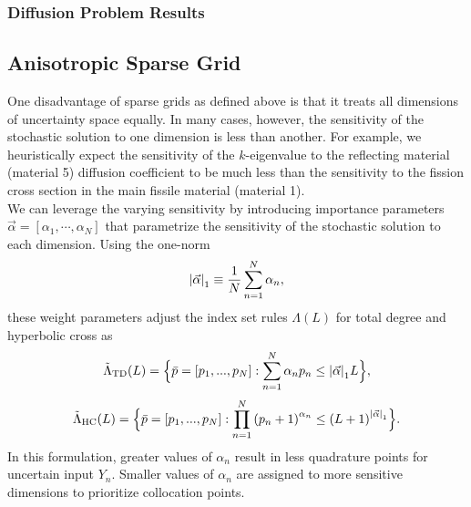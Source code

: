 \documentclass[11pt]{article}
\begin{document}
\subsubsection{Diffusion Problem Results}



\subsection{Anisotropic Sparse Grid}
One disadvantage of sparse grids as defined above is that it treats all dimensions of uncertainty space equally.  In many cases, however, the sensitivity of the stochastic solution to one dimension is less than another.  For example, we heuristically expect the sensitivity of the $k$-eigenvalue to the reflecting material (material 5) diffusion coefficient to be much less than the sensitivity to the fission cross section in the main fissile material (material 1).  \\

We can leverage the varying sensitivity by introducing importance parameters $\vec\alpha=[\alpha_1,\cdots,\alpha_N]$ that parametrize the sensitivity of the stochastic solution to each dimension.  Using the one-norm
\begin{equation}
\qty|\vec\alpha|_1\equiv\frac{1}{N}\sum_{n=1}^N \alpha_n,
\end{equation}
these weight parameters adjust the index set rules $\Lambda(L)$ for total degree and hyperbolic cross as
\begin{equation}
\tilde\Lambda_\text{TD}(L)=\Big\{\bar p=[p_1,...,p_N]:\sum_{n=1}^N \alpha_n p_n \leq \qty|\vec\alpha|_1 L \Big\},
\end{equation}
\begin{equation}
\tilde\Lambda_\text{HC}(L)=\Big\{\bar p=[p_1,...,p_N]:\prod_{n=1}^N \qty(p_n+1)^{\alpha_n} \leq \qty(L+1)^{\qty|\vec\alpha|_1} \Big\}.
\end{equation}
In this formulation, greater values of $\alpha_n$ result in less quadrature points for uncertain input $Y_n$.  Smaller values of $\alpha_n$ are assigned to more sensitive dimensions to prioritize collocation points.
\end{document}
